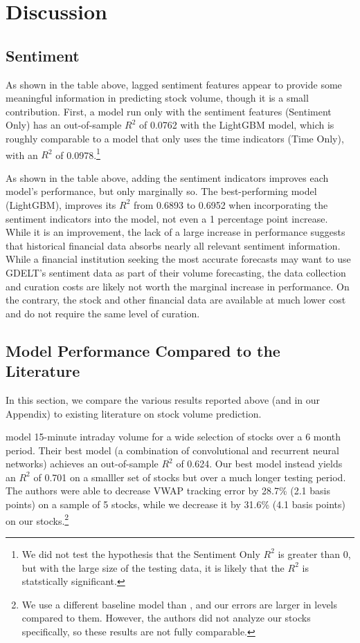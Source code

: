 \documentclass[12pt]{article}
\begin{document}
\newpage
\section{Discussion}
\label{section:discussion}
\subsection{Sentiment}
As shown in the table above, lagged sentiment features appear to provide some meaningful information in predicting stock volume, though it is a small contribution. First, a model run only with the sentiment features (Sentiment Only) has an out-of-sample $R^2$ of 0.0762 with the LightGBM model, which is roughly comparable to a model that only uses the time indicators (Time Only), with an $R^2$ of 0.0978.\footnote{We did not test the hypothesis that the Sentiment Only $R^2$ is greater than 0, but with the large size of the testing data, it is likely that the $R^2$ is statstically significant.}

As shown in the table above, adding the sentiment indicators improves each model's performance, but only marginally so. The best-performing model (LightGBM), improves its $R^2$ from 0.6893 to 0.6952 when incorporating the sentiment indicators into the model, not even a 1 percentage point increase. While it is an improvement, the lack of a large increase in performance suggests that historical financial data absorbs nearly all relevant sentiment information. While a financial institution seeking the most accurate forecasts may want to use GDELT's sentiment data as part of their volume forecasting, the data collection and curation costs are likely not worth the marginal increase in performance. On the contrary, the stock and other financial data are available at much lower cost and do not require the same level of curation.

\subsection{Model Performance Compared to the Literature}
In this section, we compare the various results reported above (and in our Appendix) to existing literature on stock volume prediction.

\textcite{cucuringu2025forecasting} model 15-minute intraday volume for a wide selection of stocks over a 6 month period. Their best model (a combination of convolutional and recurrent neural networks) achieves an out-of-sample $R^2$ of 0.624. Our best model instead yields an $R^2$ of 0.701 on a smalller set of stocks but over a much longer testing period. The authors were able to decrease VWAP tracking error by 28.7\% (2.1 basis points) on a sample of 5 stocks, while we decrease it by 31.6\% (4.1 basis points) on our stocks.\footnote{We use a different baseline model than \textcite{cucuringu2025forecasting}, and our errors are larger in levels compared to them. However, the authors did not analyze our stocks specifically, so these results are not fully comparable.}
\end{document}

